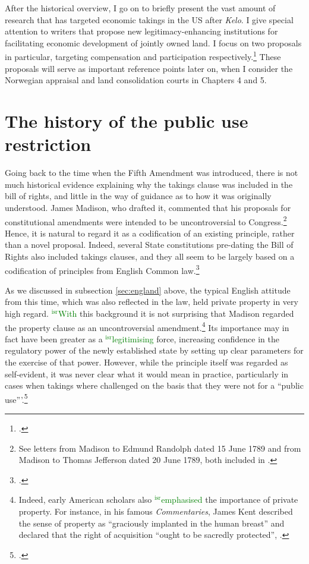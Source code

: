 \documentclass[12pt,a4paper]{book} %
\newcommand{\isr}[1]{\textcolor{green}{$^{\textrm{isr}}${#1}}}
\begin{document}
After the historical overview, I go on to briefly present the vast amount of research that has targeted economic takings in the US after {\it Kelo}. I give special attention to writers that propose new legitimacy-enhancing institutions for facilitating economic development of jointly owned land. I focus on two proposals in particular, targeting compensation and participation respectively.\footcite{lehavi07,heller08} These proposals will serve as important reference points later on, when I consider the Norwegian appraisal and land consolidation courts in Chapters 4 and 5.

\section{The history of the public use restriction}\label{sec:hop}

Going back to the time when the Fifth Amendment was introduced, there is not much historical evidence explaining why the takings clause was included in the bill of rights, and little in the way of guidance as to how it was originally understood. James Madison, who drafted it, commented that his proposals for constitutional amendments were intended to be uncontroversial to Congress.\footnote{See letters from Madison to Edmund Randolph dated 15 June 1789 and from Madison to Thomas Jefferson dated 20 June 1789, both included in \cite{madison79}.}  Hence, it is natural to regard it as a codification of an existing principle, rather than a novel proposal. Indeed, several State constitutions pre-dating the Bill of Rights also included takings clauses, and they all seem to be largely based on a codification of principles from English Common law.\footcite[See][299]{johnson11}

As we discussed in subsection \ref{sec:england} above, the typical English attitude from this time, which was also reflected in the law, held private property in very high regard. \isr{With} this background it is not surprising that Madison regarded the property clause as an uncontroversial amendment.\footnote{Indeed, early American scholars also \isr{emphasised} the importance of private property. For instance, in his famous {\it Commentaries}, James Kent described the sense of property as ``graciously implanted in the human breast'' and declared that the right of acquisition ``ought to be sacredly protected'', \cite[see][257]{kent27}.} Its importance may in fact have been greater as a \isr{legitimising} force, increasing confidence in the regulatory power of the newly established state by setting up clear parameters for the exercise of that power.  However, while the principle itself was regarded as self-evident, it was never clear what it would mean in practice, particularly in cases when takings where challenged on the basis that they were not for a ``public use'''.\footcite[See][317]{johnson11} 
\end{document}
